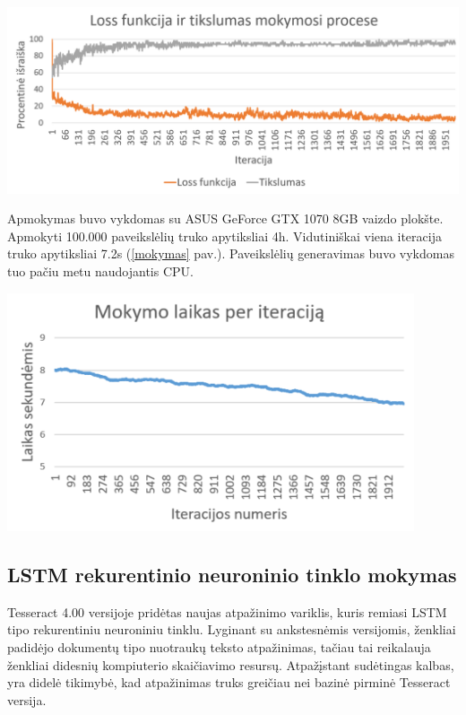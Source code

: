 \documentclass{VUMIFInfBakalaurinis}
\begin{document}
\begin{minipage}{\linewidth}
  \includegraphics[width=14cm]{statistika.png}
  \label{statistika}
\end{minipage}

Apmokymas buvo vykdomas su ASUS GeForce GTX 1070 8GB vaizdo plokšte. Apmokyti 100.000 paveikslėlių truko apytiksliai 4h. Vidutiniškai viena iteracija truko apytiksliai 7.2s (\ref{mokymas} pav.).
Paveikslėlių generavimas buvo vykdomas tuo pačiu metu naudojantis CPU.

\begin{minipage}{\linewidth}
  \includegraphics[width=12cm]{mokymas.png}
  \label{mokymas}
\end{minipage}


\subsection{LSTM rekurentinio neuroninio tinklo mokymas}

Tesseract 4.00 versijoje pridėtas naujas atpažinimo variklis, kuris remiasi LSTM tipo rekurentiniu neuroniniu tinklu.
Lyginant su ankstesnėmis versijomis, ženkliai padidėjo dokumentų tipo nuotraukų teksto atpažinimas, tačiau tai reikalauja 
ženkliai didesnių kompiuterio skaičiavimo resursų. Atpažįstant sudėtingas kalbas, yra didelė tikimybė, kad atpažinimas truks 
greičiau nei bazinė pirminė Tesseract versija.
\end{document}
